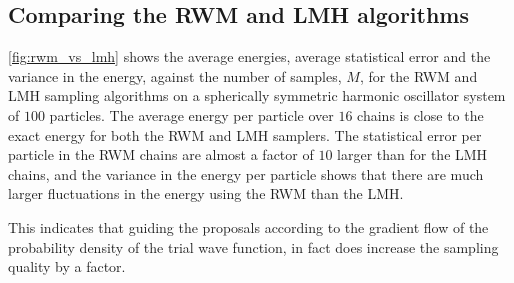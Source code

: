 \FloatBarrier

\subsection{Comparing the RWM and LMH algorithms}

\autoref{fig:rwm_vs_lmh} shows the average energies, average statistical error and the variance in the energy, against the number of samples, $M$, for the RWM and LMH sampling algorithms on a spherically symmetric harmonic oscillator system of $100$ particles. The average energy per particle over $16$ chains is close to the exact energy for both the RWM and LMH samplers. The statistical error per particle in the RWM chains are almost a factor of $10$ larger than for the LMH chains, and the variance in the energy per particle shows that there are much larger fluctuations in the energy using the RWM than the LMH. 

This indicates that guiding the proposals according to the gradient flow of the probability density of the trial wave function, in fact does increase the sampling quality by a factor. 




